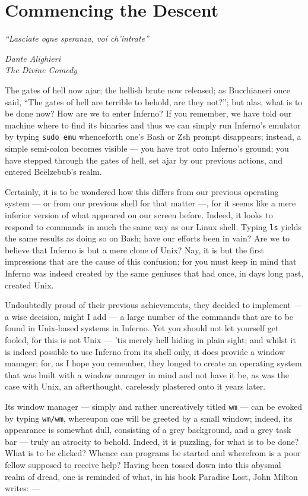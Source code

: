 \documentclass[a5paper,twoside,12pt]{report}
\begin{document}
\chapter*{Commencing the Descent}
  
  \epigraph{\textit{``Lasciate ogne speranza, voi ch'intrate''}}{\textit{Dante Alighieri\\The Divine Comedy}}

  The gates of hell now ajar; the hellish brute now released; as Bucchianeri once said, ``The gates of hell are terrible to behold, are they not?''; but alas, what is to be done now? How are we to enter Inferno? If you remember, we have told our machine where to find its binaries and thus we can simply run Inferno's emulator by typing \texttt{sudo emu} whenceforth one's Bash or Zsh prompt disappears; instead, a simple semi-colon becomes visible — you have trot onto Inferno's ground; you have stepped through the gates of hell, set ajar by our previous actions, and entered Be\"{e}lzebub's realm.

  Certainly, it is to be wondered how this differs from our previous operating system — or from our previous shell for that matter —, for it seems like a mere inferior version of what appeared on our screen before. Indeed, it looks to respond to commands in much the same way as our Linux shell. Typing \texttt{ls} yields the same results as doing so on Bash; have our efforts been in vain? Are we to believe that Inferno is but a mere clone of Unix? Nay, it is but the first impressions that are the cause of this confusion; for you must keep in mind that Inferno was indeed created by the same geniuses that had once, in days long past, created Unix.

  Undoubtedly proud of their previous achievements, they decided to implement — a wise decision, might I add — a large number of the commands that are to be found in Unix-based systems in Inferno. Yet you should not let yourself get fooled, for this is not Unix — 'tis merely hell hiding in plain sight; and whilst it is indeed possible to use Inferno from its shell only, it does provide a window manager; for, as I hope you remember, they longed to create an operating system that was built with a window manager in mind and not have it be, as was the case with Unix, an afterthought, carelessly plastered onto it years later.

	Its window manager — simply and rather uncreatively titled \texttt{wm} — can be evoked by typing \texttt{wm/wm}, whereupon one will be greeted by a small window; indeed, its appearance is somewhat dull, consisting of a grey background, and a grey task bar — truly an atrocity to behold. Indeed, it is puzzling, for what is to be done? What is to be clicked? Whence can programs be started and wherefrom is a poor fellow supposed to receive help? Having been tossed down into this abysmal realm of dread, one is reminded of what, in his book Paradise Lost, John Milton writes: —
\end{document}
